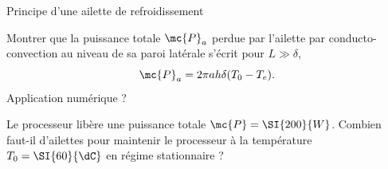 \begin{exo}[PC][3][TD]{Principe d'une ailette de refroidissement}
\begin{quest}

\item Montrer que la puissance totale $\mc{P}_a$ perdue par l'ailette par conducto-convection au niveau de sa paroi latérale s'écrit pour $L \gg \delta$,
\begin{equation}
  \mc{P}_a = 2\pi a h \delta (T_0-T_e).
\end{equation}
Application numérique ?
\item Le processeur libère une puissance totale $\mc{P}= \SI{200}{W}$. Combien faut-il d'ailettes pour maintenir le processeur à la température $T_0 = \SI{60}{\dC}$ en régime stationnaire ?
\end{quest}
\end{exo}


